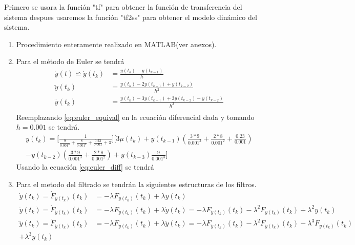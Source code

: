 \documentclass[12pt]{article}
\begin{document}
\begin{enumerate}
        
    Primero se usara la función "tf" para obtener la función de transferencia del sistema despues usaremos la función "tf2ss" para obtener el modelo dinámico del sistema.
    \begin{enumerate}
        \item Procedimiento enteramente realizado en MATLAB(ver anexos).        
        \item Para el método de Euler se tendrá
        \begin{equation}
            \begin{split}
                \dot{y}(t)\backsimeq \dot{y}(t_{k})&=\frac{y(t_{k})-y(t_{k-1})}{h}\\
                \ddot{y}(t_{k})&=\frac{y(t_{k})-2y(t_{k-1})+y(t_{k-2})}{h^2}\\
                \dddot{y}(t_{k})&=\frac{y(t_{k})-3y(t_{k-1})+3y(t_{k-2})-y(t_{k-2})}{h^3}\\
            \end{split}
            \label{eq:euler_equival}
        \end{equation}
        Reemplazando \ref{eq:euler_equival} en la ecuación diferencial dada y tomando $h= 0.001$ se tendrá.
        \begin{equation}
            \begin{split}
                y(t_k)=\lbrack\frac{1}{\frac{9}{0.001^3}+\frac{8}{0.001^2}+\frac{0.23}{0.001}+\pi}\rbrack\lbrack 3\mu(t_k) +y(t_{k-1})(\frac{3*9}{0.001^3}+\frac{2*8}{0.001^2}+\frac{0.23}{0.001})\\-y(t_{k-2})(\frac{3*9}{0.001^3}+\frac{2*8}{0.001^2})+y(t_{k-3})\frac{9}{0.001^3}\rbrack
            \end{split}
            \label{eq:euler_diff}
        \end{equation}
        Usando la ecuación \ref{eq:euler_diff} se tendrá

        
        \item Para el metodo del filtrado se tendrán la siguientes estructuras de los filtros.
        \begin{equation}
            \begin{split}
                \dot{y}(t_k)=\dot{F}_{y(t_{k})}(t_k)&=-\lambda F_{y(t_{k})}(t_{k})+\lambda y(t_{k})\\
                \ddot{y}(t_k)=\dot{F}_{\dot{y}(t_{k})}(t_k)&=-\lambda F_{\dot{y}(t_{k})}(t_{k})+\lambda \dot{y}(t_{k})=-\lambda F_{\dot{y}(t_{k})}(t_{k})-\lambda^2 F_{y(t_{k})}(t_{k})+\lambda^2y(t_{k})\\
                \dddot{y}(t_k)=\dot{F}_{\ddot{y}(t_{k})}(t_k)&=-\lambda F_{\ddot{y}(t_{k})}(t_{k})+\lambda \ddot{y}(t_{k})=-\lambda F_{\ddot{y}(t_{k})}(t_{k})-\lambda^2 F_{\dot{y}(t_{k})}(t_{k})-\lambda^3 F_{y(t_{k})}(t_{k})\\+ \lambda^3y(t_{k})
            \end{split}
            \label{eq:filters}
        \end{equation}


\end{enumerate}
\end{enumerate}
\end{document}
